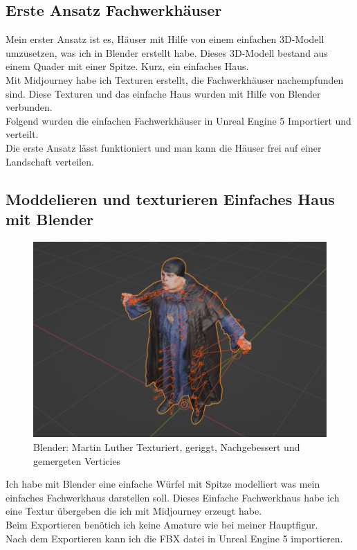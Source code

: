 {\subsection{Erste Ansatz Fachwerkhäuser}%
Mein erster Ansatz ist es, Häuser mit Hilfe von einem einfachen 3D-Modell umzusetzen, was ich in Blender erstellt habe. Dieses 3D-Modell bestand aus einem Quader mit einer Spitze. Kurz, ein einfaches Haus.
\\
Mit Midjourney habe ich Texturen erstellt, die Fachwerkhäuser nachempfunden sind. Diese Texturen und das einfache Haus wurden mit Hilfe von Blender verbunden.
\\
Folgend wurden die einfachen Fachwerkhäuser in Unreal Engine 5 Importiert und verteilt.
\\
Die erste Ansatz lässt funktioniert und man kann die Häuser frei auf einer Landschaft verteilen.
\\
\subsection{Moddelieren und texturieren Einfaches Haus mit Blender}

\begin{figure}
	\centering
	\includegraphics[width=14cm]{BilderFuerBA/BlenderMLGeriggtUndTexturiert95k.png}
	\caption{Blender: Martin Luther Texturiert, geriggt, Nachgebessert und gemergeten Verticies}
	\label{BlenderMLGeriggtUndTexturiert95k}
\end{figure}
Ich habe mit Blender eine einfache Würfel mit Spitze modelliert was mein einfaches Fachwerkhaus darstellen soll. Dieses Einfache Fachwerkhaus habe ich eine Textur übergeben die ich mit Midjourney erzeugt habe.
\\
Beim Exportieren benötich ich keine Amature wie bei meiner Hauptfigur.
\\
Nach dem Exportieren kann ich die FBX datei in Unreal Engine 5 importieren.

}
